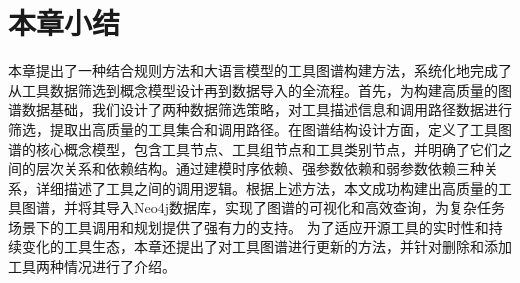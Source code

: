 \section{本章小结}

本章提出了一种结合规则方法和大语言模型的工具图谱构建方法，系统化地完成了从工具数据筛选到概念模型设计再到数据导入的全流程。首先，为构建高质量的图谱数据基础，我们设计了两种数据筛选策略，对工具描述信息和调用路径数据进行筛选，提取出高质量的工具集合和调用路径。在图谱结构设计方面，定义了工具图谱的核心概念模型，包含工具节点、工具组节点和工具类别节点，并明确了它们之间的层次关系和依赖结构。通过建模时序依赖、强参数依赖和弱参数依赖三种关系，详细描述了工具之间的调用逻辑。根据上述方法，本文成功构建出高质量的工具图谱，并将其导入Neo4j数据库，实现了图谱的可视化和高效查询，为复杂任务场景下的工具调用和规划提供了强有力的支持。
为了适应开源工具的实时性和持续变化的工具生态，本章还提出了对工具图谱进行更新的方法，并针对删除和添加工具两种情况进行了介绍。
